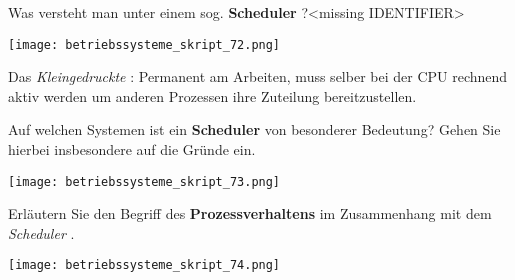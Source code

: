 \documentclass{article}
\begin{document}
\begin{tcolorbox}[colback=white!10!white,colframe=lightgray!75!black,
  savelowerto=\jobname_ex.tex,breakable,enhanced,lines before break=40]

\begin{center}
Was versteht man unter einem sog. 
\textbf{Scheduler
}?<missing IDENTIFIER>

\end{center}

\tcblower

\justifying
\begin{center}
\texttt{[image: betriebssysteme\_skript\_72.png]}
\end{center}
Das 
\textit{Kleingedruckte
}: 
Permanent am Arbeiten, muss selber bei der CPU rechnend aktiv werden um anderen Prozessen ihre Zuteilung bereitzustellen.

\end{tcolorbox}
\begin{tcolorbox}[colback=white!10!white,colframe=lightgray!75!black,
  savelowerto=\jobname_ex.tex,breakable,enhanced,lines before break=40]

\begin{center}
Auf welchen Systemen ist ein 
\textbf{Scheduler
} von besonderer Bedeutung? Gehen Sie hierbei insbesondere auf die Gründe ein.

\end{center}

\tcblower

\justifying
\begin{center}
\texttt{[image: betriebssysteme\_skript\_73.png]}
\end{center}

\end{tcolorbox}
\begin{tcolorbox}[colback=white!10!white,colframe=lightgray!75!black,
  savelowerto=\jobname_ex.tex,breakable,enhanced,lines before break=40]

\begin{center}
Erläutern Sie den Begriff des 
\textbf{Prozessverhaltens
} im Zusammenhang mit dem 
\textit{Scheduler
}.

\end{center}

\tcblower

\justifying
\begin{center}
\texttt{[image: betriebssysteme\_skript\_74.png]}
\end{center}

\end{tcolorbox}
\end{document}
